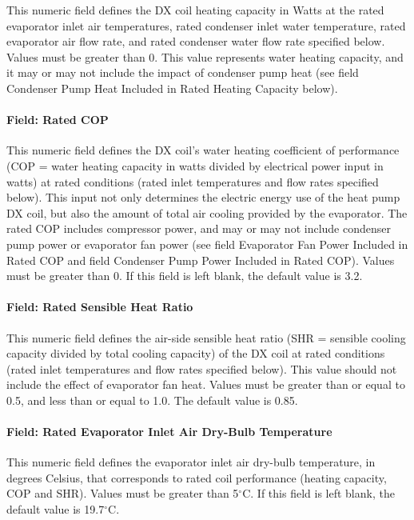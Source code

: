 This numeric field defines the DX coil heating capacity in Watts at the rated evaporator inlet air temperatures, rated condenser inlet water temperature, rated evaporator air flow rate, and rated condenser water flow rate specified below. Values must be greater than 0. This value represents water heating capacity, and it may or may not include the impact of condenser pump heat (see field Condenser Pump Heat Included in Rated Heating Capacity below).

\paragraph{Field: Rated COP}\label{field-rated-cop}

This numeric field defines the DX coil's water heating coefficient of performance (COP = water heating capacity in watts divided by electrical power input in watts) at rated conditions (rated inlet temperatures and flow rates specified below). This input not only determines the electric energy use of the heat pump DX coil, but also the amount of total air cooling provided by the evaporator. The rated COP includes compressor power, and may or may not include condenser pump power or evaporator fan power (see field Evaporator Fan Power Included in Rated COP and field Condenser Pump Power Included in Rated COP). Values must be greater than 0. If this field is left blank, the default value is 3.2.

\paragraph{Field: Rated Sensible Heat Ratio}\label{field-rated-sensible-heat-ratio-1}

This numeric field defines the air-side sensible heat ratio (SHR = sensible cooling capacity divided by total cooling capacity) of the DX coil at rated conditions (rated inlet temperatures and flow rates specified below). This value should not include the effect of evaporator fan heat. Values must be greater than or equal to 0.5, and less than or equal to 1.0. The default value is 0.85.

\paragraph{Field: Rated Evaporator Inlet Air Dry-Bulb Temperature}\label{field-rated-evaporator-inlet-air-dry-bulb-temperature}

This numeric field defines the evaporator inlet air dry-bulb temperature, in degrees Celsius, that corresponds to rated coil performance (heating capacity, COP and SHR). Values must be greater than 5$^\circ$C. If this field is left blank, the default value is 19.7$^\circ$C.

